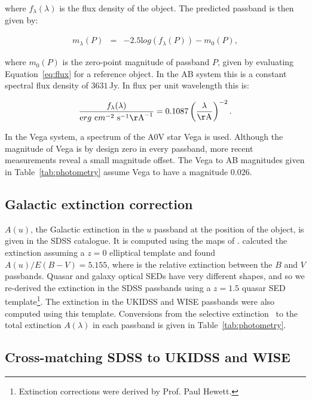 where $f_\lambda(\lambda)$ is the flux density of the object. 
The predicted passband is then given by:   

\begin{eqnarray}
\label{eq:mag}
  m_\lambda(P) & = & -2.5{\mathrm log}(f_\lambda(P)) - m_0(P), 
\end{eqnarray}

where $m_0(P)$ is the zero-point magnitude of passband $P$, given by evaluating Equation~\ref{eq:flux} for a reference object. 
In the AB system this is a constant spectral flux density of $3631$\,Jy. 
In flux per unit wavelength this is:  

\begin{eqnarray}
  \frac{f_\lambda(\lambda)}{{\mathrm erg}~{\mathrm cm}^{-2}~{\mathrm s}^{-1} {\mathrm\AA}^{-1}} = 0.1087 \left(\frac{\lambda}{\mathrm \AA}\right)^{-2}.
\end{eqnarray}

In the Vega system, a spectrum of the A$0$V star Vega is used. 
Although the magnitude of Vega is by design zero in every passband, more recent measurements reveal a small magnitude offset.
The Vega to AB magnitudes given in Table~\ref{tab:photometry} assume Vega to have a magnitude $0.026$. 

\subsection{Galactic extinction correction}

$A(u)$, the Galactic extinction in the $u$ passband at the position of the object, is given in the SDSS catalogue. 
It is computed using the maps of \citet{schlegel98}.
\citet{schlegel98} calcuted the extinction assuming a $z=0$ elliptical template and found $A(u)/E(B-V)=5.155$, where \ebv is the relative extinction between the $B$ and $V$ passbands. 
Quasar and galaxy optical SEDs have very different shapes, and so we re-derived the extinction in the SDSS passbands using a $z=1.5$ quasar SED template\footnote{Extinction corrections were derived by Prof. Paul Hewett.}.
The extinction in the UKIDSS and WISE passbands were also computed using this template. 
Conversions from the selective extinction \ebv\, to the total extinction $A(\lambda)$ in each passband is given in Table~\ref{tab:photometry}.  
 
\subsection{Cross-matching SDSS to UKIDSS and WISE}

